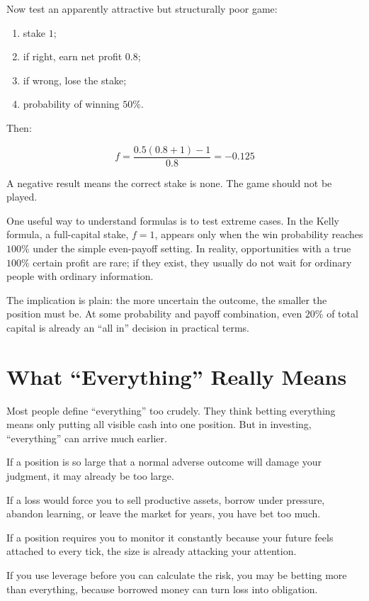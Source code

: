 Now test an apparently attractive but structurally poor game:

\begin{enumerate}
\item stake \(1\);
\item if right, earn net profit \(0.8\);
\item if wrong, lose the stake;
\item probability of winning \(50\%\).
\end{enumerate}

Then:

\[
f=\frac{0.5(0.8+1)-1}{0.8}=-0.125
\]

A negative result means the correct stake is none. The game should not be played.

One useful way to understand formulas is to test extreme cases. In the Kelly formula, a full-capital stake, \(f=1\), appears only when the win probability reaches \(100\%\) under the simple even-payoff setting. In reality, opportunities with a true \(100\%\) certain profit are rare; if they exist, they usually do not wait for ordinary people with ordinary information.

The implication is plain: the more uncertain the outcome, the smaller the position must be. At some probability and payoff combination, even \(20\%\) of total capital is already an ``all in'' decision in practical terms.

\section*{What ``Everything'' Really Means}

Most people define ``everything'' too crudely. They think betting everything means only putting all visible cash into one position. But in investing, ``everything'' can arrive much earlier.

If a position is so large that a normal adverse outcome will damage your judgment, it may already be too large.

If a loss would force you to sell productive assets, borrow under pressure, abandon learning, or leave the market for years, you have bet too much.

If a position requires you to monitor it constantly because your future feels attached to every tick, the size is already attacking your attention.

If you use leverage before you can calculate the risk, you may be betting more than everything, because borrowed money can turn loss into obligation.

